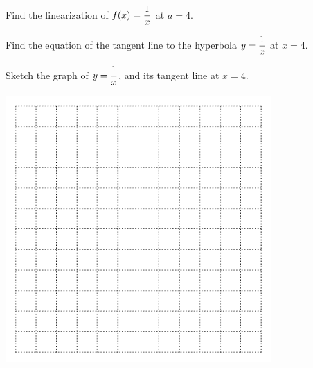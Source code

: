 \newpage
\begin{problem}
 Find the linearization of $\displaystyle f(x)=\frac{1}{x}$ at $a=4$.
\end{problem}
\vfill
\vfill

 Find the equation of the tangent line to the hyperbola $\displaystyle y=\frac{1}{x} $ at $x=4$. 
\vfill

\newpage

\problem Sketch the graph of $\displaystyle y=\frac{1}{x}$, and its tangent line at $x=4$. 

\includegraphics[width=4in]{graphics/empty_graph_square_12}





